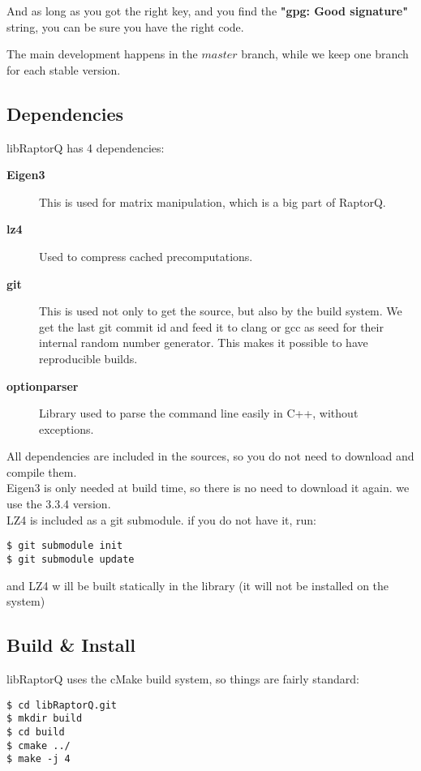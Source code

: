 \documentclass[11pt,a4paper]{refart}
\begin{document}
And as long as you got the right key, and you find the \textbf{"gpg: Good signature"} string,
you can be sure you have the right code.

The main development happens in the $master$ branch, while we keep one branch for each stable version.


\subsection{Dependencies}

libRaptorQ has 4 dependencies:
\begin{description}
\item[\textbf{Eigen3}] This is used for matrix manipulation, which is a big part of RaptorQ.
\item[\textbf{lz4}] Used to compress cached precomputations.
\item[\textbf{git}] This is used not only to get the source, but also by the build system. We get the last git commit id and feed it to clang or gcc as seed for their internal random number generator. This makes it possible to have reproducible builds.
\item[\textbf{optionparser}] Library used to parse the command line easily in C++, without exceptions.
\end{description}

All dependencies are included in the sources, so you do not need to download and compile them.\\
Eigen3 is only needed at build time, so there is no need to download it again. we use the 3.3.4 version.\\
LZ4 is included as a git submodule. if you do not have it, run:
\begin{verbatim}
$ git submodule init
$ git submodule update
\end{verbatim}
and LZ4 w
ill be built
 statically in the library (it will not be installed on the system)

\subsection{Build \& Install}

libRaptorQ uses the cMake build system, so things are fairly standard:

\begin{verbatim}
$ cd libRaptorQ.git
$ mkdir build
$ cd build
$ cmake ../
$ make -j 4
\end{verbatim}
\end{document}
